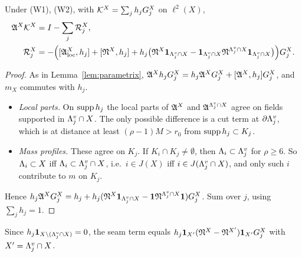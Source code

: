 \begin{lemma}\label{lem:parametrix-X}
Under (W1), (W2), with $\mathcal K^X=\sum_jh_jG^X_j$ on $\ell^2(X)$,
\[
\begin{aligned}
\mathfrak A^X\mathcal K^X&=I-\sum_j\mathcal R^X_j,\\
\mathcal R^X_j&=-\Big([\mathfrak A^X_{\rm loc},h_j]+[\mathfrak N^X,h_j]+h_j\big(\mathfrak N^X\mathbf 1_{\Lambda^v_j\cap X}-\mathbf 1_{\Lambda^v_j\cap X}\mathfrak N^{\Lambda^v_j\cap X}\mathbf 1_{\Lambda^v_j\cap X}\big)\Big)G^X_j .
\end{aligned}
\]
\end{lemma}

\begin{proof}
As in Lemma~\ref{lem:parametrix}, $\mathfrak A^Xh_jG^X_j=h_j\mathfrak A^XG^X_j+[\mathfrak A^X,h_j]G^X_j$, and $m_X$ commutes with $h_j$.
\begin{itemize}
\item \emph{Local parts.} On $\operatorname{supp} h_j$ the local parts of $\mathfrak A^X$ and $\mathfrak A^{\Lambda^v_j\cap X}$ agree on fields supported in $\Lambda^v_j\cap X$. The only possible difference is a cut term at $\partial\Lambda^v_j$, which is at distance at least $(\rho-1)M>r_0$ from $\operatorname{supp} h_j\subset K_j$.
\item \emph{Mass profiles.} These agree on $K_j$. If $K_i\cap K_j\ne\emptyset$, then $\Lambda_i\subset\Lambda^v_j$ for $\rho\ge6$. So $\Lambda_i\subset X$ iff $\Lambda_i\subset\Lambda^v_j\cap X$, i.e.\ $i\in J(X)$ iff $i\in J(\Lambda^v_j\cap X)$, and only such $i$ contribute to $m$ on $K_j$.
\end{itemize}
Hence $h_j\mathfrak A^XG^X_j=h_j+h_j(\mathfrak N^X\mathbf 1_{\Lambda^v_j\cap X}-\mathbf 1\mathfrak N^{\Lambda^v_j\cap X}\mathbf 1)G^X_j$. Sum over $j$, using $\sum_jh_j=1$.
\end{proof}

Since $h_j\mathbf 1_{X\setminus(\Lambda^v_j\cap X)}=0$, the seam term equals $h_j\mathbf 1_{X'}(\mathfrak N^X-\mathfrak N^{X'})\mathbf 1_{X'}G^X_j$ with $X'=\Lambda^v_j\cap X$.

